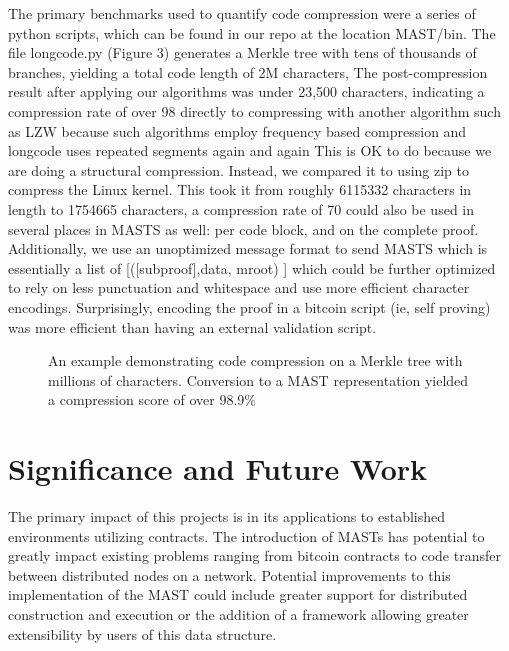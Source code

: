 \documentclass{vldb}
\begin{document}
The primary benchmarks used to quantify code compression were a series of
python scripts, which can be found in our repo at the location MAST/bin. The
file longcode.py (Figure 3) generates a Merkle tree with tens of thousands of
branches, yielding a total code length of 2M characters, The post-compression
result after applying our algorithms was under 23,500 characters, indicating a
compression rate of over 98%
directly to compressing with another algorithm such as LZW because such
algorithms employ frequency based compression and longcode uses repeated
segments again and again This is OK to do because we are doing a structural
compression. Instead, we compared it to using zip to compress the Linux kernel.
This took it from roughly 6115332 characters in length to 1754665 characters, a
compression rate of 70%
could also be used in several places in MASTS as well: per code block, and on
the complete proof. Additionally, we use an unoptimized message format to send
MASTS which is essentially a list of [([subproof],data, mroot) ] which could be
further optimized to rely on less punctuation and whitespace and use more
efficient character encodings. Surprisingly, encoding the proof in a bitcoin
script (ie, self proving) was more efficient than having an external validation script.

\begin{figure}[t!]
	
	\caption{An example demonstrating code compression on a Merkle tree with millions of characters. Conversion to a MAST representation yielded a compression score of over 98.9\%}
\end{figure}

\section{Significance and Future Work}

The primary impact of this projects is in its applications to established
environments utilizing contracts. The introduction of MASTs has potential to
greatly impact existing problems ranging from bitcoin contracts to code
transfer between distributed nodes on a network. Potential improvements to this
implementation of the MAST could include greater support for distributed
construction and execution or the addition of a framework allowing greater
extensibility by users of this data structure.



\end{document}
